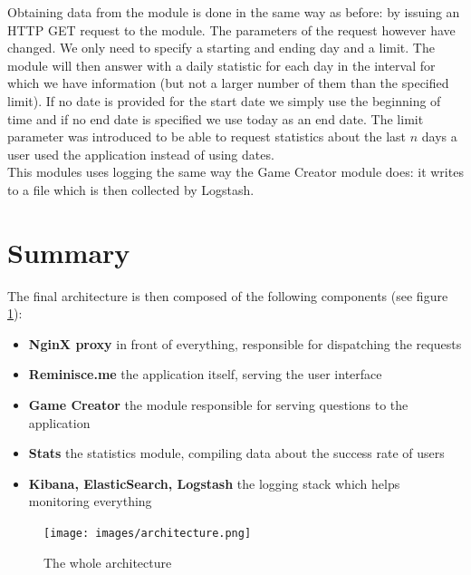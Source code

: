 Obtaining data from the module is done in the same way as before: by issuing an HTTP GET request to the module. The parameters of the request however have changed. We only need to specify a starting and ending day and a limit. The module will then answer with a daily statistic for each day in the interval for which we have information (but not a larger number of them than the specified limit). If no date is provided for the start date we simply use the beginning of time and if no end date is specified we use today as an end date. The limit parameter was introduced to be able to request statistics about the last $n$ days a user used the application instead of using dates.\\
This modules uses logging the same way the Game Creator module does: it writes to a file which is then collected by Logstash.

\section{Summary}
The final architecture is then composed of the following components (see figure \ref{fig:architecture}):
\begin{itemize}
	\item \textbf{NginX proxy} in front of everything, responsible for dispatching the requests
	\item \textbf{Reminisce.me} the application itself, serving the user interface
	\item \textbf{Game Creator} the module responsible for serving questions to the application
	\item \textbf{Stats} the statistics module, compiling data about the success rate of users
	\item \textbf{Kibana, ElasticSearch, Logstash} the logging stack which helps monitoring everything
\end{itemize}
\begin{figure}
\centering
{\texttt{[image: images/architecture.png]}}
\caption{The whole architecture}
\label{fig:architecture}
\end{figure}